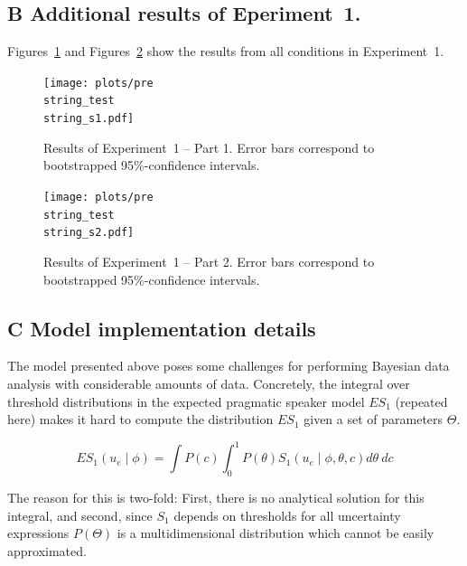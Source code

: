 \documentclass[man, floatsintext]{apa6}
\begin{document}
\pagebreak
\FloatBarrier


\subsection*{B Additional results of Eperiment~1.}

Figures~\ref{fig:norming-results-1} and Figures~\ref{fig:norming-results-2} show the results from all conditions in Experiment~1. 

\begin{figure}[h!]
\texttt{[image: plots/pre\\string\_test\\string\_s1.pdf]}
\caption{Results of Experiment~1 -- Part 1. Error bars correspond to bootstrapped 95\%-confidence intervals. \label{fig:norming-results-1}}
\end{figure}

\begin{figure}[h!]
\texttt{[image: plots/pre\\string\_test\\string\_s2.pdf]}
\caption{Results of Experiment~1  -- Part 2. Error bars correspond to bootstrapped 95\%-confidence intervals. \label{fig:norming-results-2}}
\vspace{4cm}

\end{figure}


\pagebreak
\FloatBarrier

\subsection*{C Model implementation details}

The model presented above poses some challenges for performing Bayesian data analysis with considerable amounts of data. 
Concretely, the integral over threshold distributions in the expected pragmatic speaker model $ES_1$ (repeated here) makes it hard to compute 
the distribution $ES_1$ given a set of parameters $\Theta$.

$$ES_1\left(u_e \mid \phi \right) = \int P(c) \int_0^1 P(\theta) S_1\left(u _e\mid \phi, \theta, c\right) d\theta \  d c$$

The reason for this is two-fold: First, there is no analytical solution for this integral, and second, since $S_1$ depends on
thresholds for all uncertainty expressions $P(\Theta)$ is a multidimensional distribution which cannot be easily approximated.
\end{document}
